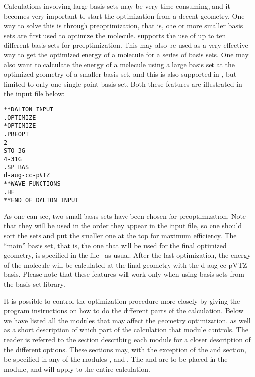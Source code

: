 Calculations involving large basis sets may be very time-consuming,
and it becomes very important to start the optimization from a decent
geometry. One way to solve this is through
preoptimization,
that is, one or more smaller basis sets are first used to optimize the
molecule.  supports the use of up to ten different
basis sets for preoptimization. This may also be used as a very
effective way to get the optimized energy of a molecule for a series
of basis sets. One may also want to calculate the energy of a molecule
using a large basis set at the optimized geometry of a smaller basis
set, and this is also supported in {\dalton}, but limited to only one
single-point basis set. Both these features are illustrated in the
input file below:

\begin{verbatim}
**DALTON INPUT
.OPTIMIZE
*OPTIMIZE
.PREOPT
2
STO-3G
4-31G
.SP BAS
d-aug-cc-pVTZ
**WAVE FUNCTIONS
.HF
**END OF DALTON INPUT
\end{verbatim}

As one can see, two small basis sets have been chosen 
for
preoptimization. Note that they will be
used in the order they appear in the input file, so one should
sort the sets and put the smaller one at the top for maximum
efficiency. The ``main'' basis set, that is, the one that will be
used for the final optimized geometry, is specified in the file
\molinp\ as usual. After the last optimization, the energy of
the molecule will be calculated at the final geometry with the
d-aug-cc-pVTZ basis. Please note that these features will work only
when using basis sets from the basis set library.

It is possible to control the optimization procedure more closely
by giving the program instructions on how to do the different parts of
the calculation. Below we have listed all the modules that may
affect the geometry optimization, as well as a short description of
which part of the calculation that module controls. The reader is
referred to the section describing each module for a closer
description of the different options. These sections may, with the
exception of the  and  section, be specified
in any of the modules , 
and . The  and  are
to be placed in the  module, and will apply to the
entire calculation.

